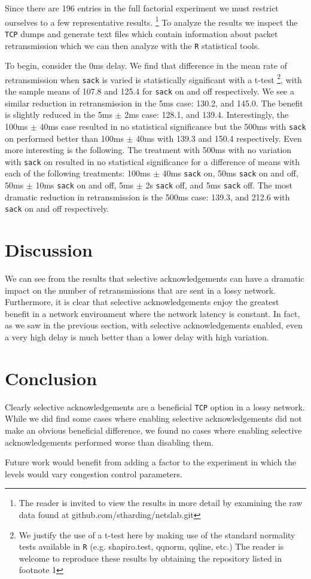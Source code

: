 \documentclass[]{article}
\begin{document}
Since there are 196 entries in the full factorial experiment we must restrict ourselves
to a few representative results. \footnote{The reader is invited to view the results 
in more detail by examining the raw data found at github.com/stharding/netslab.git} 
To analyze the results we inspect the \texttt{TCP} dumps and generate text files which
contain information about packet retransmission which we can then analyze with the
\texttt{R} statistical tools.

To begin, consider the 0ms delay. We find that difference in the mean rate of retransmission
when \texttt{sack} is varied is statistically significant with  a t-test \footnote{We
justify the use of a t-test here by making use of the standard normality tests available
in \texttt{R} (e.g. shapiro.test, qqnorm, qqline, etc.) The reader is welcome to reproduce
these results by obtaining the repository listed in footnote 1}, with the sample means of
107.8 and 125.4 for \texttt{sack} on and off respectively. We see a similar reduction in
retransmission in the 5ms case: 130.2, and 145.0. The benefit is slightly reduced in the 5ms 
$\pm$ 2ms case: 128.1, and 139.4. Interestingly, the 100ms $\pm$ 40ms case resulted in no
statistical significance but the 500ms with \texttt{sack} on performed better than 100ms 
$\pm$ 40ms with 139.3 and 150.4 respectively. Even more interesting is the following. The
treatment with 500ms with no variation with \texttt{sack} on resulted in no statistical 
significance for a difference of means with each of the following treatments: 100ms $\pm$ 
40ms \texttt{sack} on, 50ms \texttt{sack} on and off, 50ms $\pm$ 10ms \texttt{sack} on and 
off, 5ms $\pm$ 2s \texttt{sack} off, and 5ms \texttt{sack} off. The most dramatic reduction 
in retransmission is the 500ms case: 139.3, and 212.6 with \texttt{sack} on and off 
respectively.

\section{Discussion}\label{discussion}
We can see from the results that selective acknowledgements can have a dramatic impact
on the number of retransmissions that are sent in a lossy network. Furthermore, it is clear
that selective acknowledgements enjoy the greatest benefit in a network environment where
the network latency is constant. In fact, as we saw in the previous section, with selective
acknowledgements enabled, even a very high delay is much better than a lower delay with
high variation.

\section{Conclusion}\label{conclusion}
Clearly selective acknowledgements are a beneficial \texttt{TCP} option in a lossy network.
While we did find some cases where enabling selective acknowledgements did not make an
obvious beneficial difference, we found no cases where enabling selective acknowledgements 
performed worse than disabling them.

Future work would benefit from adding a factor to the experiment in which the levels would
vary congestion control parameters.

{}

\end{document}
